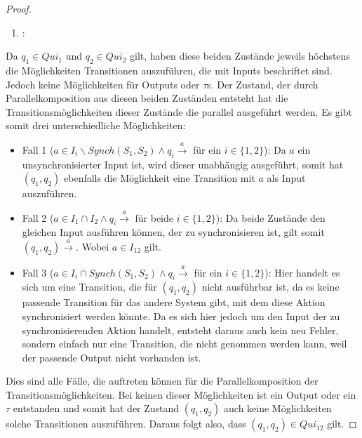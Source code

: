 \begin{proof}
  ~
  \begin{enumerate}
    \item \hspace{-0.2cm}:
  \end{enumerate}
  \vspace{-0.3cm}
  Da $q_1\in Qui_1$ und $q_2\in Qui_2$ gilt, haben
  diese beiden Zustände jeweils höchstens die Möglichkeiten Transitionen
  auszuführen, die mit Inputs beschriftet sind. Jedoch keine Möglichkeiten für
  Outputs oder $\tau$s. Der Zustand, der durch Parallelkomposition aus diesen
  beiden Zuständen entsteht hat die Transitionsmöglichkeiten dieser Zustände
  die parallel ausgeführt werden. Es gibt somit drei unterschiedliche
  Möglichkeiten:
  \begin{itemize}
    \item Fall 1 ($a\in I_i\backslash Synch(S_1,S_2)\wedge q_i
      \overset{a}{\rightarrow}$ für ein $i\in \{1,2\}$): Da $a$ ein
      unsynchronisierter Input ist, wird dieser unabhängig ausgeführt, somit hat
      $(q_1,q_2)$ ebenfalls die Möglichkeit eine Transition mit $a$ als Input
      auszuführen.
    \item Fall 2 ($a\in I_1\cap I_2\wedge q_i \overset{a}{\rightarrow}$ für
      beide $i\in \{1,2\}$): Da beide Zustände den gleichen Input ausführen
      können, der zu synchronisieren ist, gilt somit $(q_1,q_2)
      \overset{a}{\rightarrow}$. Wobei $a\in I_{12}$ gilt.
    \item Fall 3 ($a\in I_i\cap Synch(S_1,S_2)\wedge q_i
      \overset{a}{\rightarrow}$ für ein $i\in \{1,2\}$): Hier handelt es sich
      um eine Transition, die für $(q_1,q_2)$ nicht ausführbar ist, da es keine
      passende Transition für das andere System gibt, mit dem diese Aktion
      synchronisiert werden könnte. Da es sich hier jedoch um den Input der zu
      synchronisierenden Aktion handelt, entsteht daraus auch kein
      neu Fehler, sondern einfach nur eine Transition, die nicht
      genommen werden kann, weil der passende Output nicht vorhanden ist.
  \end{itemize}
  Dies sind alle Fälle, die auftreten können für die Parallelkomposition der
  Transitionsmöglichkeiten. Bei keinen dieser Möglichkeiten ist ein Output oder
  ein $\tau$ entstanden und somit hat der Zustand $(q_1,q_2)$ auch keine
  Möglichkeiten solche Transitionen auszuführen. Daraus folgt also, dass
  $(q_1,q_2)\in Qui_{12}$ gilt.


\end{proof}
